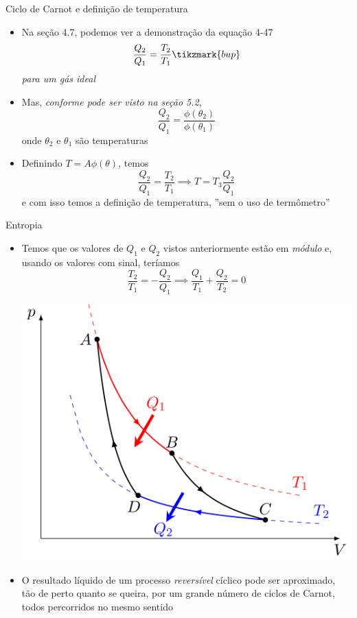 \documentclass[t,%
brazilian,%
11pt,%
aspectratio=169,%
table%
]{beamer}
\begin{document}
\begin{frame}{Ciclo de Carnot e definição de temperatura}
    \begin{itemize}
        \item Na seção 4.7, podemos ver a demonstração da equação 4-47
            \[
                \frac{Q_2}{Q_1} = \frac{T_2}{T_1} \tikzmark{bup}
            \]
            \textit{para um gás ideal}
        \item Mas, \textit{conforme pode ser visto na seção 5.2}, 
            \[
                \frac{Q_2}{Q_1} = \frac{\phi(\theta_2)}{\phi(\theta_1)}
            \]
            onde \(\theta_2\) e \(\theta_1\) são temperaturas
        \item Definindo \(T=A\phi(\theta)\), temos
            \[
                \frac{Q_2}{Q_1} = \frac{T_2}{T_1} \implies T=T_3 \frac{Q_2}{Q_1}
            \]
            e com isso temos a definição de temperatura, ''sem o uso de termômetro'' 

    \end{itemize}
\end{frame}

\begin{frame}{Entropia}
    \begin{itemize}
        \item Temos que os valores de \(Q_1\) e \(Q_2\) vistos anteriormente estão em \textit{módulo}
            e, usando os valores com sinal, teríamos
            \[
                \frac{T_2}{T_1}=-\frac{Q_2}{Q_1} \implies \frac{Q_1}{T_1} + \frac{Q_2}{T_2}=0
            \]
            \begin{center}
                \includegraphics[height=\textheight-92pt-42pt]{images/Carnot-cycle-p-V-diagram.svg.png}
            \end{center}
        \item O resultado líquido de um processo \textit{reversível} cíclico pode ser 
            aproximado, tão de perto quanto se queira, por um grande número de ciclos de Carnot,
            todos percorridos no mesmo sentido
    \end{itemize}
\end{frame}
\end{document}
